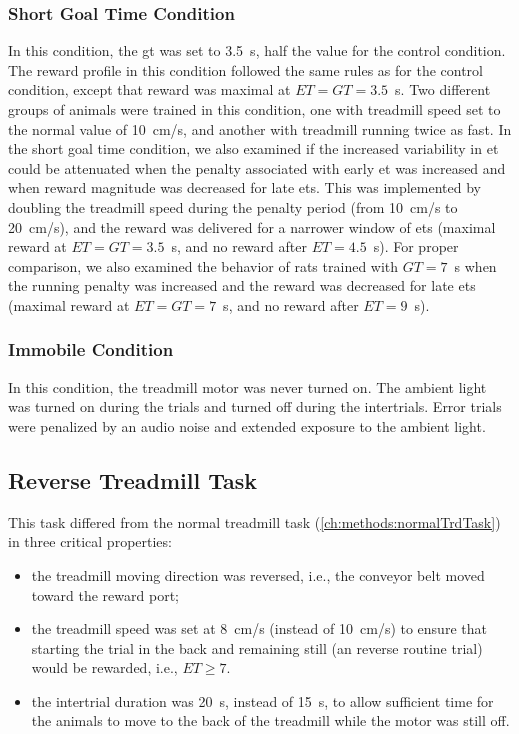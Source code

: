 \subsubsection{Short Goal Time Condition}
In this condition, the \gls{gt} was set to 3.5~s, half the value for the control condition.
The reward profile in this condition followed the same rules as for the control condition, except that reward was maximal at $ET=GT=3.5$~s.
Two different groups of animals were trained in this condition, one with treadmill speed set to the normal value of 10~cm/s, and another with treadmill running twice as fast.
In the short goal time condition, we also examined if the increased variability in \gls{et} could be attenuated when the penalty associated with early \gls{et} was increased and when reward magnitude was decreased for late \glspl{et}.
This was implemented by doubling the treadmill speed during the penalty period (from 10~cm/s to 20~cm/s), and the reward was delivered for a narrower window of \glspl{et} (maximal reward at $ET=GT=3.5$~s, and no reward after $ET=4.5$~s).
For proper comparison, we also examined the behavior of rats trained with $GT=7$~s when the running penalty was increased and the reward was decreased for late \glspl{et} (maximal reward at $ET=GT=7$~s, and no reward after $ET=9$~s).

\subsubsection{Immobile Condition}
In this condition, the treadmill motor was never turned on.
The ambient light was turned on during the trials and turned off during the intertrials.
Error trials were penalized by an audio noise and extended exposure to the ambient light.


\subsection{Reverse Treadmill Task} \label{ch:methods:rev}
This task differed from the normal treadmill task (\autoref{ch:methods:normalTrdTask}) in three critical properties:
\begin{itemize}[noitemsep]
    \item the treadmill moving direction was reversed, i.e., the conveyor belt moved toward the reward port;
    \item the treadmill speed was set at 8~cm/s (instead of 10~cm/s) to ensure that starting the trial in the back and remaining still (an reverse routine trial) would be rewarded, i.e., $ET\geq 7$.
    \item the intertrial duration was 20~s, instead of 15~s, to allow sufficient time for the animals to move to the back of the treadmill while the motor was still off.
\end{itemize}


